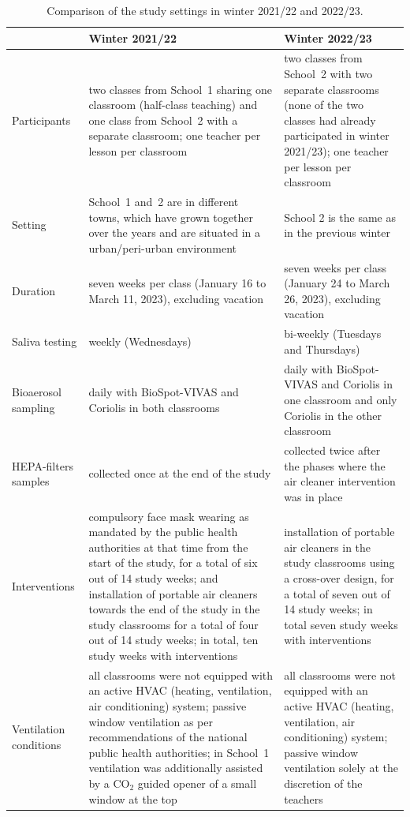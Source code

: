 \documentclass[fleqn,11pt]{wlscirep_supp}
\begin{document}
\appendix

\begin{table}[!htpb]
    \caption{Comparison of the study settings in winter 2021/22 and 2022/23.}
    \label{tab:comp_study}
    \centering
    \renewcommand{\arraystretch}{1.5}
    \begin{tabular}{lp{6cm}p{6cm}}
        \toprule
        & \textbf{Winter 2021/22} & \textbf{Winter 2022/23} \\
        \midrule
        Participants & two classes from School~1 sharing one classroom (half-class teaching) and one class from School~2 with a separate classroom; one teacher per lesson per classroom & two classes from School~2 with two separate classrooms (none of the two classes had already participated in winter 2021/23); one teacher per lesson per classroom \\
        Setting & School~1 and~2 are in different towns, which have grown together over the years and are situated in a urban/peri-urban environment & School 2 is the same as in the previous winter \\
        Duration & seven weeks per class (January 16 to March 11, 2023), excluding vacation & seven weeks per class (January 24 to March 26, 2023), excluding vacation \\
        Saliva testing & weekly (Wednesdays) & bi-weekly (Tuesdays and Thursdays) \\
        Bioaerosol sampling & daily with BioSpot-VIVAS and Coriolis in both classrooms & daily with BioSpot-VIVAS and Coriolis in one classroom and only Coriolis in the other classroom \\
        HEPA-filters samples & collected once at the end of the study & collected twice after the phases where the air cleaner intervention was in place \\
        Interventions & compulsory face mask wearing as mandated by the public health authorities at that time from the start of the study, for a total of six out of 14 study weeks; and installation of portable air cleaners towards the end of the study in the study classrooms for a total of four out of 14 study weeks; in total, ten study weeks with interventions & installation of portable air cleaners in the study classrooms using a cross-over design, for a total of seven out of 14 study weeks; in total seven study weeks with interventions\\
        Ventilation conditions & all classrooms were not equipped with an active HVAC (heating, ventilation, air conditioning) system; passive window ventilation as per recommendations of the national public health authorities; in School~1 ventilation was additionally assisted by a CO$_2$ guided opener of a small window at the top  & all classrooms were not equipped with an active HVAC (heating, ventilation, air conditioning) system; passive window ventilation solely at the discretion of the teachers \\
        \bottomrule
    \end{tabular}
\end{table}
\end{document}
